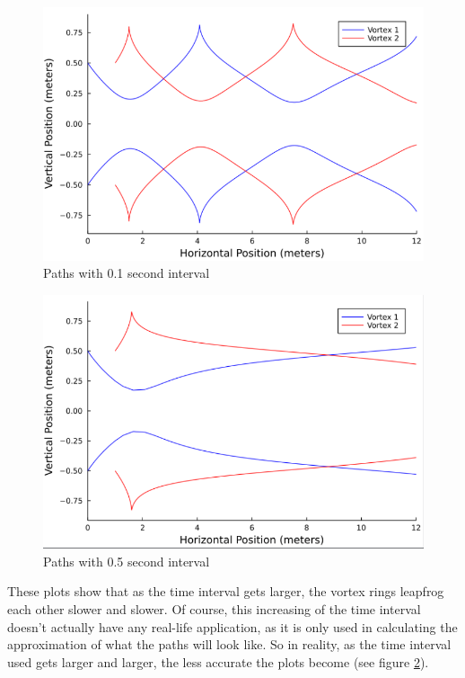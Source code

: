\documentclass{article}
\begin{document}
\begin{figure}[ht]
\centering
\includegraphics[scale=0.75]{plots_1.1.4000.1.png}
\caption{Paths with 0.1 second interval}
\label{fig:paths_1_time}
\end{figure}

\begin{figure}[ht]
\centering
\includegraphics[scale=0.75]{plots_1.1.4000.5.png}
\caption{Paths with 0.5 second interval}
\label{fig:paths_5_time}
\end{figure}

These plots show that as the time interval gets larger, the vortex rings leapfrog each other slower and slower. Of course, this increasing of the time interval doesn't actually have any real-life application, as it is only used in calculating the approximation of what the paths will look like. So in reality, as the time interval used gets larger and larger, the less accurate the plots become (see figure \ref{fig:paths_5_time}).
\end{document}
